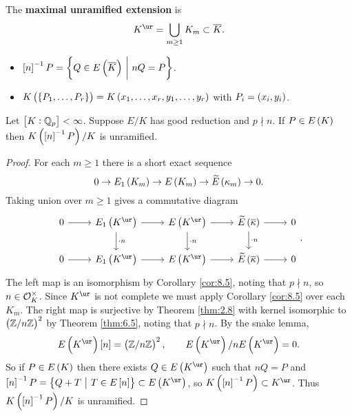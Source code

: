 \begin{definition*}
The \textbf{maximal unramified extension} is
$$ K^{\ur} = \bigcup_{m \ge 1} K_m \subset \overline{K}. $$
\end{definition*}

\begin{notation*}
\hfill
\begin{itemize}
\item $ \sbr{n}^{-1}P = \cbr{Q \in E\br{\overline{K}} \st nQ = P} $.
\item $ K\br{\cbr{P_1, \dots, P_r}} = K\br{x_1, \dots, x_r, y_1, \dots, y_r} $ with $ P_i = \br{x_i, y_i} $.
\end{itemize}
\end{notation*}

\begin{theorem}
\label{thm:9.9}
Let $ \sbr{K : \QQ_p} < \infty $. Suppose $ E / K $ has good reduction and $ p \nmid n $. If $ P \in E\br{K} $ then $ K\br{\sbr{n}^{-1}P} / K $ is unramified.
\end{theorem}

\begin{proof}
For each $ m \ge 1 $ there is a short exact sequence
$$ 0 \to E_1\br{K_m} \to E\br{K_m} \to \widetilde{E}\br{\kappa_m} \to 0. $$
Taking union over $ m \ge 1 $ gives a commutative diagram
$$
\begin{tikzcd}
0 \arrow{r} & E_1\br{K^{\ur}} \arrow{r} \arrow{d}{\cdot n} & E\br{K^{\ur}} \arrow{r} \arrow{d}{\cdot n} & \widetilde{E}\br{\overline{\kappa}} \arrow{r} \arrow{d}{\cdot n} & 0 \\
0 \arrow{r} & E_1\br{K^{\ur}} \arrow{r} & E\br{K^{\ur}} \arrow{r} & \widetilde{E}\br{\overline{\kappa}} \arrow{r} & 0
\end{tikzcd}.
$$
The left map is an isomorphism by Corollary \ref{cor:8.5}, noting that $ p \nmid n $, so $ n \in \mathcal{O}_K^\times $. Since $ K^{\ur} $ is not complete we must apply Corollary \ref{cor:8.5} over each $ K_m $. The right map is surjective by Theorem \ref{thm:2.8} with kernel isomorphic to $ \br{\ZZ / n\ZZ}^2 $ by Theorem \ref{thm:6.5}, noting that $ p \nmid n $. By the snake lemma,
$$ E\br{K^{\ur}}\sbr{n} = \br{\ZZ / n\ZZ}^2, \qquad E\br{K^{\ur}} / nE\br{K^{\ur}} = 0. $$
So if $ P \in E\br{K} $ then there exists $ Q \in E\br{K^{\ur}} $ such that $ nQ = P $ and $ \sbr{n}^{-1}P = \cbr{Q + T \st T \in E\sbr{n}} \subset E\br{K^{\ur}} $, so $ K\br{\sbr{n}^{-1}P} \subset K^{\ur} $. Thus $ K\br{\sbr{n}^{-1}P} / K $ is unramified.
\end{proof}

